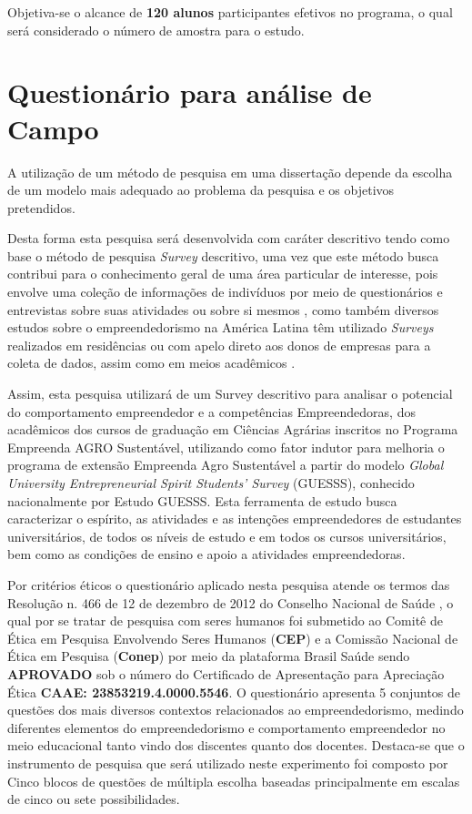 Objetiva-se o alcance de \textbf{120 alunos} participantes efetivos no programa, o qual será considerado o número de amostra para o estudo. 

\newpage



\section{Questionário para análise de Campo}

A utilização de um método de pesquisa em uma dissertação depende da escolha de um modelo mais adequado ao problema da pesquisa e os objetivos pretendidos.

Desta forma esta pesquisa será desenvolvida com caráter descritivo tendo como base o método de pesquisa \textit{Survey} descritivo, uma vez que este método busca contribui para o conhecimento geral de uma área particular de interesse, pois envolve uma coleção de informações de indivíduos por meio de questionários e entrevistas sobre suas atividades ou sobre si mesmos \cite{forza_survey_2002}, como também diversos estudos sobre o empreendedorismo na América Latina têm utilizado \textit{Surveys} realizados em residências ou com apelo direto aos donos de empresas para a coleta de dados, assim como em meios acadêmicos \cite{lima_ser_2015}. 


Assim, esta pesquisa utilizará de um Survey descritivo para analisar o potencial do comportamento empreendedor e a competências Empreendedoras, dos acadêmicos dos cursos de graduação em Ciências Agrárias inscritos no Programa Empreenda AGRO Sustentável, utilizando como fator indutor para melhoria o programa de extensão Empreenda Agro Sustentável a partir do modelo \textit{Global University Entrepreneurial Spirit Students’ Survey} (GUESSS), conhecido nacionalmente por Estudo GUESSS. Esta ferramenta de estudo busca caracterizar o espírito, as atividades e as intenções empreendedores de estudantes universitários, de todos os níveis de estudo e em todos os cursos universitários, bem como as condições de ensino e apoio a atividades empreendedoras. 



Por critérios éticos o questionário aplicado nesta pesquisa atende os termos das Resolução n. 466 de 12 de dezembro de 2012 do Conselho Nacional de Saúde \cite{cns_resolucao_2012}, o qual por se tratar de pesquisa com seres humanos foi submetido ao Comitê de Ética em Pesquisa Envolvendo Seres Humanos (\textbf{CEP}) e a Comissão Nacional de Ética em Pesquisa (\textbf{Conep}) por meio da plataforma Brasil Saúde sendo \textbf{APROVADO} sob o número do Certificado de Apresentação para Apreciação Ética \textbf{CAAE: 23853219.4.0000.5546}. O questionário apresenta 5 conjuntos de questões dos mais diversos contextos relacionados ao empreendedorismo, medindo diferentes elementos do empreendedorismo e comportamento empreendedor no meio educacional tanto vindo dos discentes quanto dos docentes. Destaca-se que o instrumento de pesquisa que será utilizado neste experimento foi composto por Cinco blocos de questões de múltipla escolha baseadas principalmente em escalas de cinco ou sete possibilidades. 

